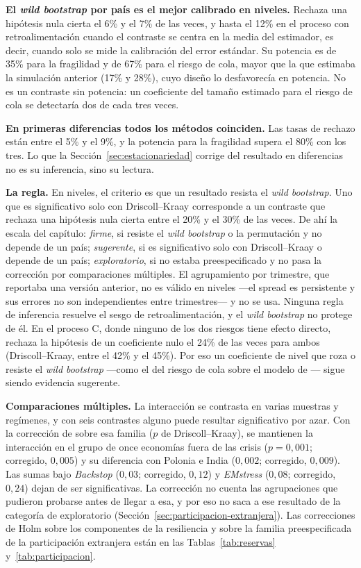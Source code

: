 \textbf{El \textit{wild bootstrap} por país es el mejor calibrado en niveles.} Rechaza una hipótesis nula cierta el 6\% y el 7\% de las veces, y hasta el 12\% en el proceso con retroalimentación cuando el contraste se centra en la media del estimador, es decir, cuando solo se mide la calibración del error estándar. Su potencia es de 35\% para la fragilidad y de 67\% para el riesgo de cola, mayor que la que estimaba la simulación anterior (17\% y 28\%), cuyo diseño lo desfavorecía en potencia. No es un contraste sin potencia: un coeficiente del tamaño estimado para el riesgo de cola se detectaría dos de cada tres veces.

\textbf{En primeras diferencias todos los métodos coinciden.} Las tasas de rechazo están entre el 5\% y el 9\%, y la potencia para la fragilidad supera el 80\% con los tres. Lo que la Sección~\ref{sec:estacionariedad} corrige del resultado en diferencias no es su inferencia, sino su lectura.

\textbf{La regla.} En niveles, el criterio es que un resultado resista el \textit{wild bootstrap}. Uno que es significativo solo con Driscoll--Kraay corresponde a un contraste que rechaza una hipótesis nula cierta entre el 20\% y el 30\% de las veces. De ahí la escala del capítulo: \emph{firme}, si resiste el \textit{wild bootstrap} o la permutación y no depende de un país; \emph{sugerente}, si es significativo solo con Driscoll--Kraay o depende de un país; \emph{exploratorio}, si no estaba preespecificado y no pasa la corrección por comparaciones múltiples. El agrupamiento por trimestre, que reportaba una versión anterior, no es válido en niveles ---el spread es persistente y sus errores no son independientes entre trimestres--- y no se usa. Ninguna regla de inferencia resuelve el sesgo de retroalimentación, y el \textit{wild bootstrap} no protege de él. En el proceso C, donde ninguno de los dos riesgos tiene efecto directo, rechaza la hipótesis de un coeficiente nulo el 24\% de las veces para ambos (Driscoll--Kraay, entre el 42\% y el 45\%). Por eso un coeficiente de nivel que roza o resiste el \textit{wild bootstrap} ---como el del riesgo de cola sobre el modelo de \citet{Chari2024b}--- sigue siendo evidencia sugerente.

\textbf{Comparaciones múltiples.} La interacción se contrasta en varias muestras y regímenes, y con seis contrastes alguno puede resultar significativo por azar. Con la corrección de \citet{Holm1979} sobre esa familia ($p$ de Driscoll--Kraay), se mantienen la interacción en el grupo de once economías fuera de las crisis ($p=0{,}001$; corregido, $0{,}005$) y su diferencia con Polonia e India ($0{,}002$; corregido, $0{,}009$). Las sumas bajo \textit{Backstop} ($0{,}03$; corregido, $0{,}12$) y \textit{EMstress} ($0{,}08$; corregido, $0{,}24$) dejan de ser significativas. La corrección no cuenta las agrupaciones que pudieron probarse antes de llegar a esa, y por eso no saca a ese resultado de la categoría de exploratorio (Sección~\ref{sec:participacion-extranjera}). Las correcciones de Holm sobre los componentes de la resiliencia y sobre la familia preespecificada de la participación extranjera están en las Tablas~\ref{tab:reservas} y~\ref{tab:participacion}.

